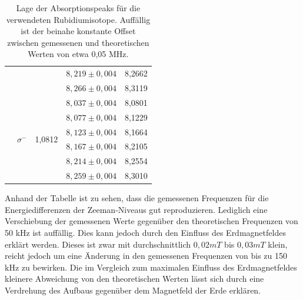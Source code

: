 \documentclass[bigchapter,colorback,accentcolor=tud4b,linedtoc,11pt]{tudreport}
\begin{document}
\begin{table}[H]
\begin{center}
\begin{tabular}{c|c l|ll}
                                  &                               &                         & $8,219 \pm 0,004$ & 8,2662                       \\ 
                                  &                               &                         & $8,266 \pm 0,004$ & 8,3119                       \\ \cline{2-5}
                                  & \multirow{6}{*}{$\sigma^{-}$} & \multirow{6}{*}{1,0812} & $8,037 \pm 0,004$ & 8,0801                       \\ 
                                  &                               &                         & $8,077 \pm 0,004$ & 8,1229                       \\ 
                                  &                               &                         & $8,123 \pm 0,004$ & 8,1664                       \\ 
                                  &                               &                         & $8,167 \pm 0,004$ & 8,2105                       \\ 
                                  &                               &                         & $8,214 \pm 0,004$ & 8,2554                       \\ 
                                  &                               &                         & $8,259 \pm 0,004$ & 8,3010                       \\ \hline
    \end{tabular}
    \caption{Lage der Absorptionspeaks für die verwendeten
      Rubidiumisotope. Auffällig ist der beinahe konstante Offset zwischen
      gemessenen und theoretischen Werten von etwa 0,05 MHz.}
  \end{center}
\end{table}

Anhand der Tabelle ist zu sehen, dass die gemessenen Frequenzen für die
Energiedifferenzen der Zeeman-Niveaus gut reproduzieren. Lediglich eine
Verschiebung der gemessenen Werte gegenüber den theoretischen Frequenzen von
50 kHz ist auffällig. Dies kann jedoch durch den Einfluss des Erdmagnetfeldes
erklärt werden. Dieses ist zwar mit durchschnittlich $0,02mT$ bis $0,03mT$
klein, reicht jedoch um eine Änderung in den gemessenen Frequenzen von bis zu
150 kHz zu bewirken. Die im Vergleich zum maximalen Einfluss des Erdmagnetfeldes
kleinere Abweichung von den theoretischen Werten lässt sich durch eine
Verdrehung des Aufbaus gegenüber dem Magnetfeld der Erde erklären.
\end{document}
